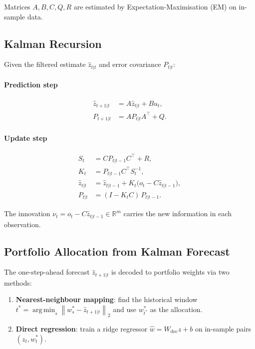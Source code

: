 \documentclass[12pt, a4paper]{report}
\theoremstyle{plain}
\theoremstyle{definition}
\newcommand{\R}{\mathbb{R}}
\newcommand{\norm}[1]{\left\|#1\right\|}
\DeclareMathOperator*{\argmin}{arg\,min}
\begin{document}
Matrices $A, B, C, Q, R$ are estimated by Expectation-Maximisation (EM) on
in-sample data.

\subsection{Kalman Recursion}
\label{subsec:kalman_recursion}

Given the filtered estimate $\hat{z}_{t|t}$ and error covariance $P_{t|t}$:

\paragraph{Prediction step}
\begin{align}
  \hat{z}_{t+1|t} &= A\hat{z}_{t|t} + Bu_t,
  \label{eq:kf_pred_state}\\
  P_{t+1|t} &= A P_{t|t} A^\top + Q.
  \label{eq:kf_pred_cov}
\end{align}

\paragraph{Update step}
\begin{align}
  S_t &= C P_{t|t-1} C^\top + R,
  \label{eq:innovation_cov}\\
  K_t &= P_{t|t-1} C^\top S_t^{-1},
  \label{eq:kalman_gain}\\
  \hat{z}_{t|t} &= \hat{z}_{t|t-1} + K_t\bigl(o_t - C\hat{z}_{t|t-1}\bigr),
  \label{eq:kf_update_state}\\
  P_{t|t} &= (I - K_t C)\,P_{t|t-1}.
  \label{eq:kf_update_cov}
\end{align}

The innovation $\nu_t = o_t - C\hat{z}_{t|t-1} \in \R^m$ carries the
new information in each observation.

\subsection{Portfolio Allocation from Kalman Forecast}
\label{subsec:allocation}

The one-step-ahead forecast $\hat{z}_{t+1|t}$ is decoded to portfolio weights
via two methods:

\begin{enumerate}
  \item \textbf{Nearest-neighbour mapping}: find the historical window
        $t^* = \argmin_s \norm{w_s^* - \hat{z}_{t+1|t}}_2$ and use $w_{t^*}^*$
        as the allocation.
  \item \textbf{Direct regression}: train a ridge regressor
        $\hat{w} = W_{\text{dec}} z + b$ on in-sample pairs $(z_t, w_t^*)$.
\end{enumerate}
\end{document}
